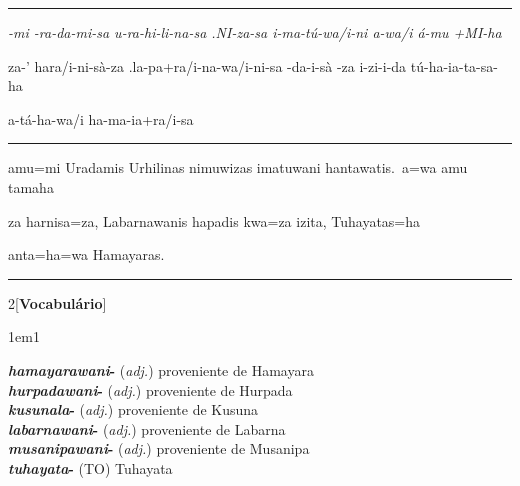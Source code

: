 \vspace{5pt}
\hrule
\vspace{5pt}


\setcounter{parcount}{0}
\begin{parnumbersa}[]
	\raggedright%
	\itshape%
	-mi
	-ra-da-mi-sa
	u-ra-hi-li-na-sa
	.NI-za-sa
	i-ma-tú-wa/i-ni
	a-wa/i
	á-mu
	+MI-ha

	za-'
	hara/i-ni-sà-za
	.la-pa+ra/i-na-wa/i-ni-sa
	-da-i-sà
	-za
	i-zi-i-da
	tú-ha-ia-ta-sa-ha

	a-tá-ha-wa/i ha-ma-ia+ra/i-sa



\end{parnumbersa}

\vspace{5pt}
\hrule
\vspace{5pt}


\setcounter{parcount}{0}
\begin{parnumbersa}[]
	\raggedright%
	\itshape%

	amu=mi Uradamis Urhilinas nimuwizas imatuwani hantawatis.\ a=wa amu tamaha

	za harnisa=za, Labarnawanis hapadis kwa=za izita,
	Tuhayatas=ha

	anta=ha=wa Hamayaras.


\end{parnumbersa}

\vspace{5pt}
\hrule
\vspace{20pt}



\begin{multicols}{2}[\noindent\textbf{Vocabulário}]
	\begin{hangparas}{1em}{1}
		\raggedright%
		\textbf{\emph{hamayarawani}-} (\emph{adj.}) \tabto{1em} proveniente de Hamayara\\
		\textbf{\emph{hurpadawani}-} (\emph{adj.}) \tabto{1em} proveniente de Hurpada\\
		\textbf{\emph{kusunala}-} (\emph{adj.}) \tabto{1em} proveniente de Kusuna\\
		\textbf{\emph{labarnawani}-} (\emph{adj.}) \tabto{1em} proveniente de Labarna\\
		\textbf{\emph{musanipawani}-} (\emph{adj.}) \tabto{1em} proveniente de Musanipa\\
		\textbf{\emph{tuhayata}-} (TO) \tabto{1em} Tuhayata\\
	\end{hangparas}
\end{multicols}

\vfill
